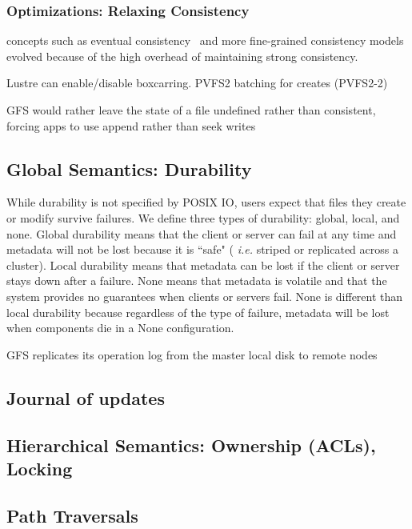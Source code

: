 \subsubsection{Optimizations: Relaxing Consistency}

 concepts such as eventual
consistency~\cite{amazon} and more fine-grained consistency
models~\cite{baseball} evolved because of the high overhead of maintaining
strong consistency.

Lustre can enable/disable boxcarring.
PVFS2 batching for creates (PVFS2-2)

GFS would rather leave the state of a file undefined rather than consistent,
forcing apps to use append rather than seek writes

\subsection{Global Semantics: Durability}

While durability is not specified by POSIX IO, users expect that files they
create or modify survive failures.  We define three types of durability:
global, local, and none.  Global durability means that the client or server can
fail at any time and metadata will not be lost because it is ``safe" ({\it
i.e.} striped or replicated across a cluster). Local durability means that
metadata can be lost if the client or server stays down after a failure. None
means that metadata is volatile and that the system provides no guarantees when
clients or servers fail.  None is different than local durability because
regardless of the type of failure, metadata will be lost when components die in a
None configuration.

GFS replicates its operation log from the master local disk to remote nodes


\subsection{Journal of updates}

\subsection{Hierarchical Semantics: Ownership (ACLs), Locking}
\subsection{Path Traversals}

